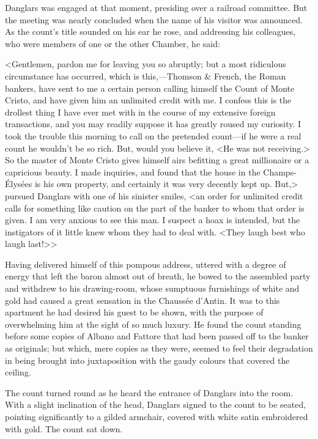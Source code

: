 Danglars was engaged at that moment, presiding over a railroad committee. But the meeting was nearly concluded when the name of his visitor was announced. As the count's title sounded on his ear he rose, and addressing his colleagues, who were members of one or the other Chamber, he said: 

 <Gentlemen, pardon me for leaving you so abruptly; but a most ridiculous circumstance has occurred, which is this,—Thomson \& French, the Roman bankers, have sent to me a certain person calling himself the Count of Monte Cristo, and have given him an unlimited credit with me. I confess this is the drollest thing I have ever met with in the course of my extensive foreign transactions, and you may readily suppose it has greatly roused my curiosity. I took the trouble this morning to call on the pretended count—if he were a real count he wouldn't be so rich. But, would you believe it, <He was not receiving.> So the master of Monte Cristo gives himself airs befitting a great millionaire or a capricious beauty. I made inquiries, and found that the house in the Champs-Élysées is his own property, and certainly it was very decently kept up. But,> pursued Danglars with one of his sinister smiles, <an order for unlimited credit calls for something like caution on the part of the banker to whom that order is given. I am very anxious to see this man. I suspect a hoax is intended, but the instigators of it little knew whom they had to deal with. <They laugh best who laugh last!>> 

 Having delivered himself of this pompous address, uttered with a degree of energy that left the baron almost out of breath, he bowed to the assembled party and withdrew to his drawing-room, whose sumptuous furnishings of white and gold had caused a great sensation in the Chaussée d'Antin. It was to this apartment he had desired his guest to be shown, with the purpose of overwhelming him at the sight of so much luxury. He found the count standing before some copies of Albano and Fattore that had been passed off to the banker as originals; but which, mere copies as they were, seemed to feel their degradation in being brought into juxtaposition with the gaudy colours that covered the ceiling. 

 The count turned round as he heard the entrance of Danglars into the room. With a slight inclination of the head, Danglars signed to the count to be seated, pointing significantly to a gilded armchair, covered with white satin embroidered with gold. The count sat down.  
 
